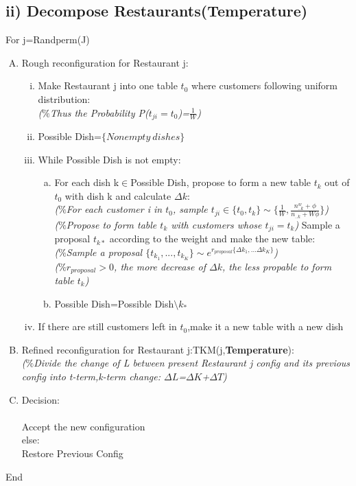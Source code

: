 \documentclass{article}
\begin{document}
\begin{spacing}{1.1}
\subsection{ii) Decompose Restaurants(Temperature)}
For j=Randperm(J)
\begin{enumerate}[(A)]
\item Rough reconfiguration for Restaurant j:
\begin{enumerate}[(i)]
\item Make Restaurant j into one table $t_{0}$ where customers following uniform distribution:\\
\small{\emph{($\%$Thus the Probability P($t_{ji}=t_{0}$)=$\frac{1}{W}$)}}
\item Possible Dish=$\{Nonempty \ dishes\}$
\item While Possible Dish is not empty:
\begin{enumerate}[(a)]
\item For each dish k$\in$Possible Dish, propose to form a new table $t_{k}$ out of $t_{0}$ with dish k and calculate {\color{red}{the change for these two dishes}} $\Delta k$:\\
\small{\emph{($\%$For each customer i in $t_{0}$, sample $t_{ji}\in\{t_{0},t_{k}\}\sim\{\frac{1}{W},\frac{n_{..k}^{w}+\phi}{n_{..k}+W\phi}\}$)}}\\
\small{\emph{($\%$Propose to form table $t_{k}$ with customers whose $t_{ji}=t_{k}$)}}
Sample a proposal $t_{k*}$ according to the weight and make the new table:\\
\small{\emph{($\%$Sample a proposal $\{t_{k_{1}},...,t_{k_{K}}\}\sim e^{r_{proposal}\{\Delta k_{1},...\Delta k_{K}\}}$)}}\\
\small{\emph{($\%r_{proposal}>0$, the more decrease of $\Delta k$, the less propable to form table $t_{k}$)}}
\item Possible Dish=Possible Dish$\setminus k_{*}$
\end{enumerate}
\item If there are still customers left in $t_{0}$,make it a new table with a new dish
\end{enumerate}

\item Refined reconfiguration for Restaurant j:TKM(j,{\bf Temperature}):\\
\small{\emph{($\%$Divide the change of L between present Restaurant j config and its previous config into t-term,k-term change: $\Delta L$=$\Delta K$+$\Delta T$)}}
\item Decision:\\
{}\\
Accept the new configuration\\ 
else:\\
Restore Previous Config\\
\end{enumerate}
End

\end{spacing}
\end{document}

